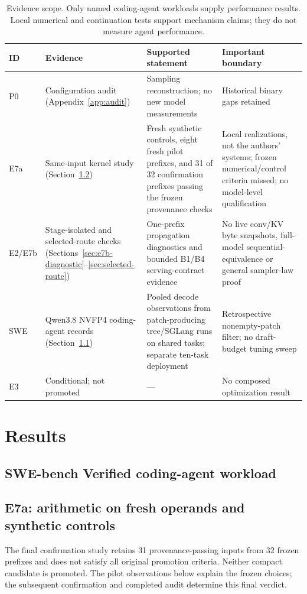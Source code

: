 \documentclass[conference]{IEEEtran}
\begin{document}
\begin{table}[t]
\caption{Evidence scope. Only named coding-agent workloads supply performance results. Local numerical and continuation tests support mechanism claims; they do not measure agent performance.}
\label{tab:evidence}
\centering\footnotesize
\begin{tabularx}{\textwidth}{@{}p{}p{}Yp{0.25\textwidth}@{}}
\toprule
ID & Evidence & Supported statement & Important boundary \\
\midrule
P0 & Configuration audit (Appendix~\ref{app:audit}) & Sampling reconstruction; no new model measurements & Historical binary gaps retained \\
E7a & Same-input kernel study (Section~\ref{sec:e7a-pilot}) & Fresh synthetic controls, eight fresh pilot prefixes, and 31 of 32 confirmation prefixes passing the frozen provenance checks & Local realizations, not the authors' systems; frozen numerical/control criteria missed; no model-level qualification \\
E2/E7b & Stage-isolated and selected-route checks (Sections~\ref{sec:e7b-diagnostic}--\ref{sec:selected-route}) & One-prefix propagation diagnostics and bounded B1/B4 serving-contract evidence & No live conv/KV byte snapshots, full-model sequential-equivalence or general sampler-law proof \\
SWE & Qwen3.8 NVFP4 coding-agent records (Section~\ref{sec:agent-workload}) & Pooled decode observations from patch-producing tree/SGLang runs on shared tasks; separate ten-task deployment & Retrospective nonempty-patch filter; no draft-budget tuning sweep \\
E3 & Conditional; not promoted & --- & No composed optimization result \\
\bottomrule
\end{tabularx}
\end{table}

\section{Results}
\label{sec:results}
\subsection{SWE-bench Verified coding-agent workload}
\label{sec:agent-workload}


\subsection{E7a: arithmetic on fresh operands and synthetic controls}
\label{sec:e7a-pilot}
The final confirmation study retains 31 provenance-passing inputs from 32 frozen prefixes and does not satisfy all original promotion criteria. Neither compact candidate is promoted. The pilot observations below explain the frozen choices; the subsequent confirmation and completed audit determine this final verdict.
\end{document}
